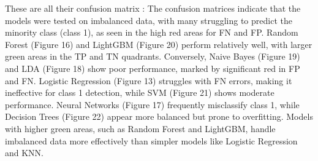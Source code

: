 \documentclass[12pt,a4paper]{article}
\begin{document}
These are all their confusion matrix :
The confusion matrices indicate that the models were tested on imbalanced data, with many struggling to predict the minority class (class 1), as seen in the high red areas for FN and FP. Random Forest (Figure 16) and LightGBM (Figure 20) perform relatively well, with larger green areas in the TP and TN quadrants. Conversely, Naive Bayes (Figure 19) and LDA (Figure 18) show poor performance, marked by significant red in FP and FN. Logistic Regression (Figure 13) struggles with FN errors, making it ineffective for class 1 detection, while SVM (Figure 21) shows moderate performance. Neural Networks (Figure 17) frequently misclassify class 1, while Decision Trees (Figure 22) appear more balanced but prone to overfitting. Models with higher green areas, such as Random Forest and LightGBM, handle imbalanced data more effectively than simpler models like Logistic Regression and KNN.
\end{document}
